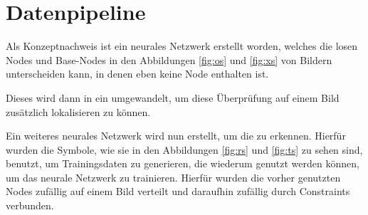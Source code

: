 \section{Datenpipeline}
Als Konzeptnachweis ist ein neurales Netzwerk erstellt worden, welches die losen Nodes und Base-Nodes in den Abbildungen \ref{fig:os} und \ref{fig:xs} von Bildern unterscheiden kann, in denen eben keine Node enthalten ist. 

Dieses wird dann in ein \cite{Long2014} umgewandelt, um diese Überprüfung auf einem Bild zusätzlich lokalisieren zu können.

Ein weiteres neurales Netzwerk wird nun erstellt, um die  zu erkennen.
Hierfür wurden die Symbole, wie sie in den Abbildungen \ref{fig:rs} und \ref{fig:ts} zu sehen sind, benutzt, um Trainingsdaten zu generieren, die wiederum genutzt werden können, um das neurale Netzwerk zu trainieren.
Hierfür wurden die vorher genutzten Nodes zufällig auf einem Bild verteilt und daraufhin zufällig durch Constraints verbunden.

